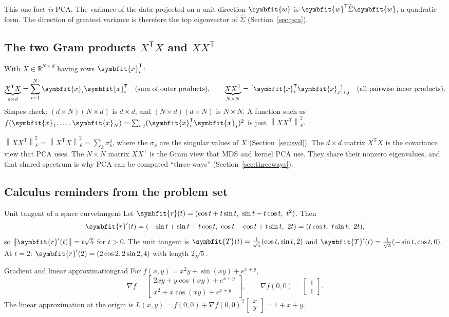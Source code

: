 \documentclass[11pt]{article}
\newcommand{\bm}[1]{\symbfit{#1}}
\newcommand{\R}{\mathbb{R}}
\newcommand{\vx}{\bm{x}}
\newcommand{\vw}{\bm{w}}
\newcommand{\Sig}{\widehat{\Sigma}}
\newcommand{\T}{^{\mathsf T}}
\newcommand{\norm}[1]{\left\lVert #1\right\rVert}
\newcommand{\Fro}[1]{\left\lVert #1\right\rVert_F}
\begin{document}
\begin{deeper}
This one fact \emph{is} PCA. The variance of the data projected on a unit direction
$\vw$ is $\vw\T\Sig\vw$, a quadratic form. The direction of greatest variance is
therefore the top eigenvector of $\Sig$ (Section~\ref{sec:pca}).
\end{deeper}

\subsection{The two Gram products $X\T X$ and $XX\T$}\label{sec:gram}

With $X\in\R^{N\times d}$ having rows $\vx_i\T$:
\[
\underbrace{X\T X}_{d\times d}=\sum_{i=1}^N \vx_i\vx_i\T \quad(\text{sum of outer products}),\qquad
\underbrace{XX\T}_{N\times N}=\big[\vx_i\T\vx_j\big]_{i,j}\quad(\text{all pairwise inner products}).
\]
Shapes check: $(d\times N)(N\times d)$ is $d\times d$, and $(N\times d)(d\times N)$ is $N\times N$.
A function such as $f(\vx_1,\dots,\vx_N)=\sum_{i,j}(\vx_i\T\vx_j)^2$ is just
$\Fro{XX\T}^2$.

\begin{deeper}
$\Fro{XX\T}^2=\Fro{X\T X}^2=\sum_k\sigma_k^4$, where the $\sigma_k$ are the singular
values of $X$ (Section~\ref{sec:svd}). The $d\times d$ matrix $X\T X$ is the
covariance view that PCA uses. The $N\times N$ matrix $XX\T$ is the Gram view that
MDS and kernel PCA use. They share their nonzero eigenvalues, and that shared
spectrum is why PCA can be computed ``three ways'' (Section~\ref{sec:threeways}).
\end{deeper}

\subsection{Calculus reminders from the problem set}

\begin{example}{Unit tangent of a space curve}{tangent}
Let $\bm r(t)=(\cos t+t\sin t,\ \sin t-t\cos t,\ t^2)$. Then
\[
\bm r'(t)=(-\sin t+\sin t+t\cos t,\ \cos t-\cos t+t\sin t,\ 2t)=(t\cos t,\ t\sin t,\ 2t),
\]
so $\norm{\bm r'(t)}=t\sqrt5$ for $t>0$. The unit tangent is
$\bm T(t)=\tfrac1{\sqrt5}(\cos t,\sin t,2)$ and
$\bm T'(t)=\tfrac1{\sqrt5}(-\sin t,\cos t,0)$. At $t=2$:
$\bm r'(2)=(2\cos2,2\sin2,4)$ with length $2\sqrt5$.
\end{example}

\begin{example}{Gradient and linear approximation}{grad}
For $f(x,y)=x^2y+\sin(xy)+e^{x+y}$,
\[
\nabla f=\begin{bmatrix}2xy+y\cos(xy)+e^{x+y}\\ x^2+x\cos(xy)+e^{x+y}\end{bmatrix},
\qquad \nabla f(0,0)=\begin{bmatrix}1\\1\end{bmatrix}.
\]
The linear approximation at the origin is
$L(x,y)=f(0,0)+\nabla f(0,0)\T\begin{bmatrix}x\\y\end{bmatrix}=1+x+y$.
\end{example}
\end{document}
